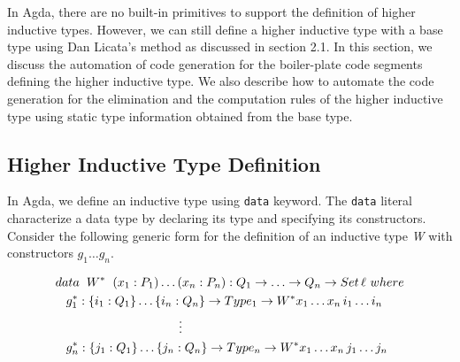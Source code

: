 \documentclass[sigplan,10pt]{acmart}
\begin{document}
In Agda, there are no built-in primitives to support the definition of higher inductive types. However, we can still define a higher inductive type with a base type using Dan Licata's \citep{Licata-2011} method as discussed in section 2.1. In this section, we discuss the automation of code generation for the boiler-plate code segments defining the higher inductive type. We also describe how to automate the code generation for the elimination and the computation rules of the higher inductive type using static type information obtained from the base type.


\subsection{Higher Inductive Type Definition}
\label{sec:sec4.1}

In Agda, we define an inductive type using {\tt data} keyword. The {\tt data} literal characterize a data type by declaring its type and specifying its constructors. Consider the following generic form for the definition of an inductive type \emph{W} with constructors $g_1 \ldots g_n$. 
\begin{center}
\begingroup
\fontsize{7.9pt}{0pt}\selectfont
\begin{align}
& data \hspace{0.2cm} W^* \hspace{0.2cm} (x_1:P_1)\ldots(x_n:P_n) : Q_1 \rightarrow\ldots\rightarrow Q_n \rightarrow Set \, \ell \, \, where \nonumber \\
& \hspace{0.3cm} g_1^* : \{i_1 : Q_1\} \ldots \{i_n : Q_n\} \rightarrow Type_1\rightarrow W^* x_1 \ldots x_n \, i_1 \ldots i_n \nonumber \\
& \hspace{3.5cm} \vdots \nonumber \\ 
& \hspace{0.3cm} g_n^* : \{j_1 : Q_1\} \ldots \{j_n : Q_n\} \rightarrow Type_n\rightarrow W^* x_1 \dots x_n \, j_1 \ldots j_n \nonumber \\ \nonumber
\end{align}
\endgroup
\end{center}
\normalsize
\end{document}
